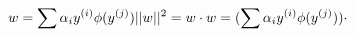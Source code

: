 \documentclass[10pt]{article}
\begin{document}
\[w = \sum\alpha_i y^{(i)} \phi (y^{(j)})
\\
||w||^2 = w \cdot w = (\sum\alpha_i y^{(i)} \phi (y^{(j)})) \cdot\]
\end{document}
